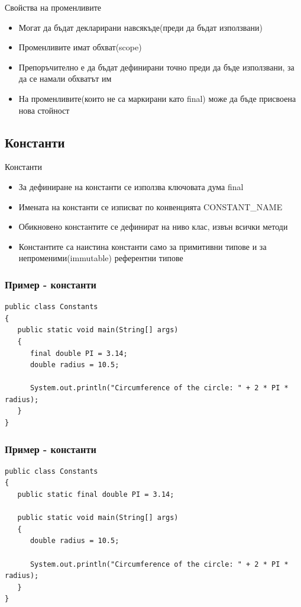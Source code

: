 \documentclass{beamer}
\begin{document}
\begin{frame}{Свойства на променливите}
  \transdissolve
  \begin{itemize}
  \item Могат да бъдат декларирани навсякъде(преди да бъдат
    използвани)
  \item Променливите имат обхват(scope)
  \item Препоръчително е да бъдат дефинирани точно преди да бъде
    използвани, за да се намали обхватът им
  \item На променливите(които не са маркирани като final) може да бъде
    присвоена нова стойност
  \end{itemize}
\end{frame}

\subsection{Константи}
\begin{frame}{Константи}
  \begin{itemize}
  \item За дефиниране на константи се използва ключовата дума final
  \item Имената на константи се изписват по конвенцията CONSTANT\_NAME
  \item Обикновено константите се дефинират на ниво клас, извън всички
    методи
  \item Константите са наистина константи само за примитивни типове и
    за непроменими(immutable) референтни типове
  \end{itemize}
\end{frame}

\begin{frame}[fragile]
  \frametitle{Пример - константи}
  \transdissolve
\begin{lstlisting}
public class Constants
{
   public static void main(String[] args)
   {
      final double PI = 3.14;
      double radius = 10.5;

      System.out.println("Circumference of the circle: " + 2 * PI * radius);
   }
}
\end{lstlisting}
\end{frame}

\begin{frame}[fragile]
  \frametitle{Пример - константи}
  \transdissolve
\begin{lstlisting}
public class Constants
{
   public static final double PI = 3.14;

   public static void main(String[] args)
   {
      double radius = 10.5;

      System.out.println("Circumference of the circle: " + 2 * PI * radius);
   }
}
\end{lstlisting}
\end{frame}
\end{document}
